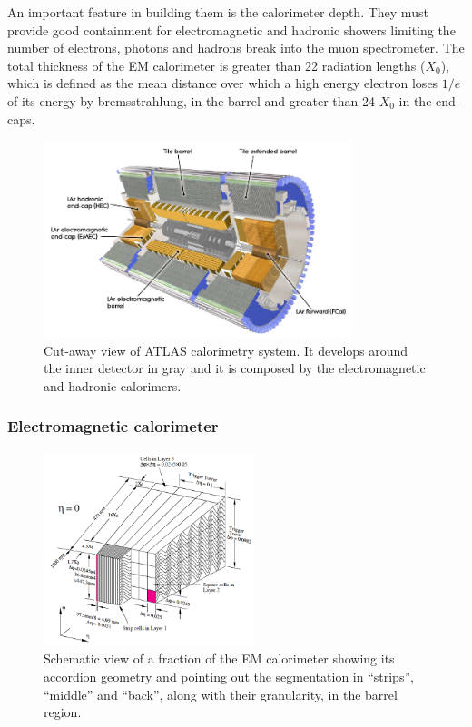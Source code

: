 An important feature in building them is the calorimeter depth. They must provide good containment for electromagnetic and hadronic showers limiting the number of electrons, photons and hadrons break into the muon spectrometer. The total thickness of the EM calorimeter is greater than 22 radiation lengths ($X_0$), which is defined as the mean distance over which a high energy electron loses $1/e$ of its energy by bremsstrahlung, in the barrel and greater than 24 $X_0$ in the end-caps.

\begin{figure}[tp]
\centering
\includegraphics[width=0.8\textwidth]{LHC_ATLAS/Calorimetry}
\caption{Cut-away view of ATLAS calorimetry system. It develops around the inner detector in gray and it is composed by the electromagnetic and hadronic calorimers.}
\label{fig:Calos}
\end{figure}

\subsubsection{Electromagnetic calorimeter}
\begin{figure}[tp]
\centering
\includegraphics[width=0.55\textwidth]{LHC_ATLAS/EMcalo}
\caption{Schematic view of a fraction of the EM calorimeter showing its accordion geometry and pointing out the segmentation in ``strips'', ``middle'' and ``back'', along with their granularity, in the  barrel region.}
\label{fig:EMlayers}
\end{figure}

